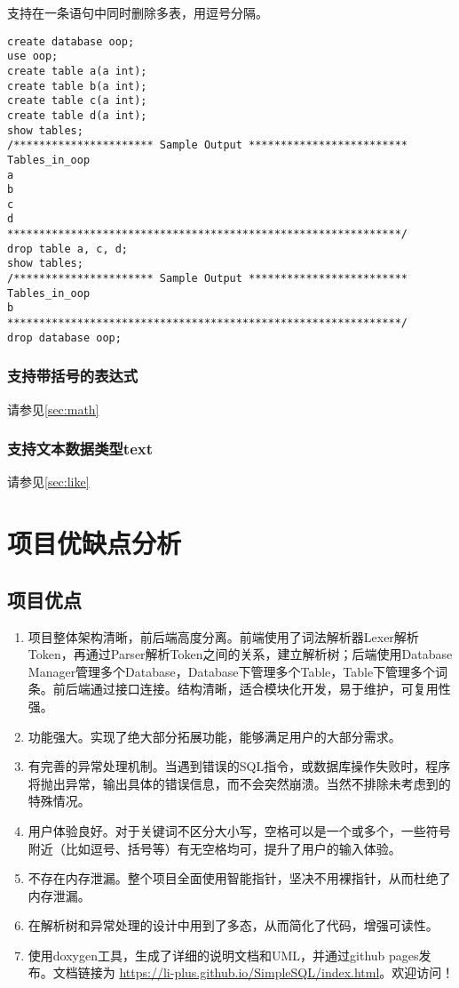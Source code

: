\documentclass[12pt,a4paper]{article}
\begin{document}
支持在一条语句中同时删除多表，用逗号分隔。

\begin{lstlisting}
create database oop;
use oop;
create table a(a int); 
create table b(a int); 
create table c(a int); 
create table d(a int); 
show tables; 
/********************** Sample Output *************************
Tables_in_oop
a
b
c
d
**************************************************************/
drop table a, c, d; 
show tables; 
/********************** Sample Output *************************
Tables_in_oop
b
**************************************************************/
drop database oop; 
\end{lstlisting}

\subsubsection{支持带括号的表达式}

请参见\cref{sec:math}

\subsubsection{支持文本数据类型text}

请参见\cref{sec:like}

\section{项目优缺点分析}

\subsection{项目优点}

\begin{enumerate}
\item 
项目整体架构清晰，前后端高度分离。前端使用了词法解析器Lexer解析Token，再通过Parser解析Token之间的关系，建立解析树；后端使用Database Manager管理多个Database，Database下管理多个Table，Table下管理多个词条。前后端通过接口连接。结构清晰，适合模块化开发，易于维护，可复用性强。
\item 
功能强大。实现了绝大部分拓展功能，能够满足用户的大部分需求。
\item
有完善的异常处理机制。当遇到错误的SQL指令，或数据库操作失败时，程序将抛出异常，输出具体的错误信息，而不会突然崩溃。当然不排除未考虑到的特殊情况。
\item 
用户体验良好。对于关键词不区分大小写，空格可以是一个或多个，一些符号附近（比如逗号、括号等）有无空格均可，提升了用户的输入体验。
\item
不存在内存泄漏。整个项目全面使用智能指针，坚决不用裸指针，从而杜绝了内存泄漏。
\item 
在解析树和异常处理的设计中用到了多态，从而简化了代码，增强可读性。
\item
使用doxygen工具，生成了详细的说明文档和UML，并通过github pages发布。文档链接为 \url{https://li-plus.github.io/SimpleSQL/index.html}。欢迎访问！
\end{enumerate}
\end{document}
